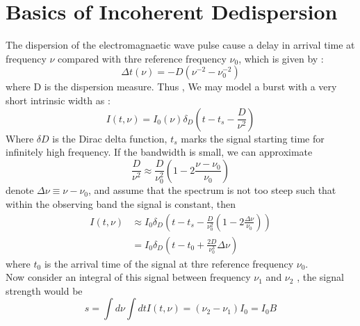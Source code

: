 \documentclass[twocolumn]{aastex61}
\begin{document}



\section{Basics of Incoherent Dedispersion}
\label{sec:obs}

The dispersion of the electromagnaetic wave pulse cause a delay in arrival time at frequency $\nu$ compared with thre reference frequency $\nu_0$, which is given by :
\begin{equation}
\Delta t (\nu) = -D(\nu^{-2} -\nu^{-2}_{0})
\end{equation}
where D is the dispersion measure. Thus , We may model a burst with a very short intrinsic width as :
\begin{equation}
I(t,\nu)=I_0(\nu)\delta_D(t-t_s -\frac{D}{\nu^2})
\end{equation}
Where $\delta D$ is the Dirac delta function, $t_s$ marks the signal starting time for infinitely high frequency. If the bandwidth is small, we can approximate
\begin{equation*}
\frac{D}{\nu^{2}}\approx\frac{D}{\nu_0^2}(1-2\frac{\nu-\nu_0}{\nu_0})
\end{equation*}
denote $\Delta　\nu \equiv \nu - \nu_0$, and assume that the spectrum is not too steep such that within the observing band the signal is constant, then
\begin{equation}
\begin{aligned}
I(t,\nu) & \approx I_0\delta_D(t-t_s-\frac{D}{\nu_0^2}(1-2\frac{\Delta\nu}{\nu_0}) ) \\
		 & = I_0\delta_D(t -t_0 +\frac{2D}{\nu_0^3}\Delta\nu)
\end{aligned} 
\end{equation}
where $t_0$ is the arrival time of the signal at thre reference frequency $\nu_0$. \\
	Now consider an integral of this signal between frequency $\nu_1 $ and $\nu_2$ , the signal strength would be
\begin{equation}
s = \int d \nu \int dtI(t,\nu)=(\nu_2 -\nu_1)I_0 = I_0B
\end{equation}
\end{document}
